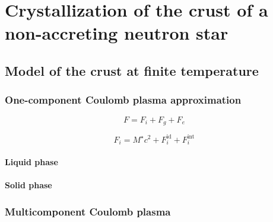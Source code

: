 \chapter{Crystallization of the crust of a non-accreting neutron star}

\section{Model of the crust at finite temperature}


\subsection{One-component Coulomb plasma approximation}



\begin{equation}
  F = F_i + F_g + F_e
\end{equation}

\begin{equation}
  F_i = M^\star c^2 + F_i^{\text{id}} + F_i^{\text{int}}
\end{equation}


\subsubsection{Liquid phase}

\subsubsection{Solid phase}

\subsection{Multicomponent Coulomb plasma}

